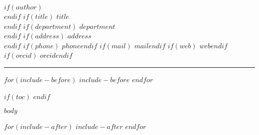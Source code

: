 \documentclass[10pt]{scrartcl}
\begin{document}
\begin{center}
  $if(author)$\textbf{\LARGE\color{titlegrey}}\\$endif$
  $if(title)$ $title$\\$endif$
  $if(department)$ $department$\\$endif$
  $if(address)$ $address$\\$endif$
  $if(phone)$\faPhone{} $phone$$endif$
  $if(mail)$ \href{mailto:$mail$}{$mail$}$endif$
  $if(web)$ \href{https://$web$}{$web$}$endif$
  $if(orcid)$\aiOrcid{} \href{https://orcid.org/$orcid$}{$orcid$}$endif$
  \par\noindent\rule{\textwidth}{0.4pt}
\end{center}

$for(include-before)$
$include-before$
$endfor$

$if(toc)$
\tableofcontents
$endif$

$body$

$for(include-after)$
$include-after$
$endfor$
\end{document}
